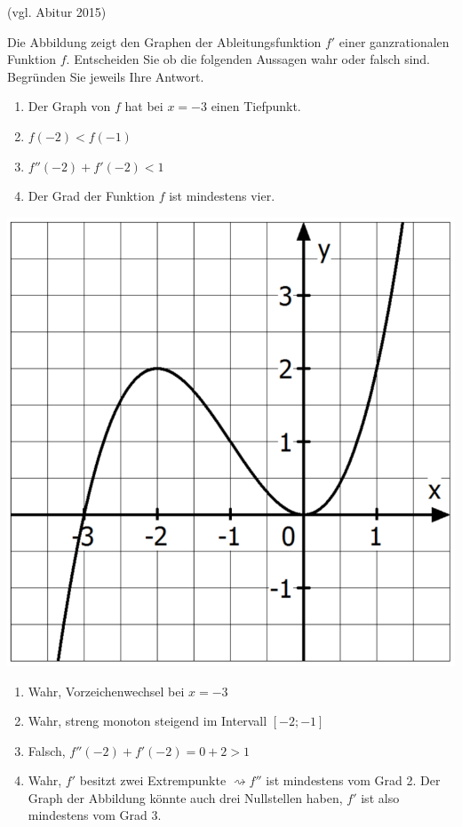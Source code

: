  (vgl. Abitur 2015)
\begin{multicols}{2}
	Die Abbildung zeigt den Graphen der Ableitungsfunktion $f'$ einer ganzrationalen Funktion $f$.
	Entscheiden Sie ob die folgenden Aussagen wahr oder falsch sind. Begründen Sie jeweils Ihre Antwort.
	\begin{enumerate}
		\item Der Graph von $f$ hat bei $x=-3$ einen Tiefpunkt.
		\item $f(-2)<f(-1)$
		\item $f''(-2)+f'(-2)<1$
		\item Der Grad der Funktion $f$ ist mindestens vier.
	\end{enumerate}
	\columnbreak

	\centering
	\includegraphics[width=0.7\linewidth]{Graphanalyse.png}
\end{multicols}

\begin{lsg}{}
	\begin{enumerate}
		\item Wahr, Vorzeichenwechsel bei $x=-3$
		\item Wahr, streng monoton steigend im Intervall $[-2;-1]$
		\item Falsch, $f''(-2)+f'(-2)=0+2>1$
		\item Wahr, $f'$ besitzt zwei Extrempunkte $\rightsquigarrow f''$ ist mindestens vom Grad 2. Der Graph der Abbildung könnte auch drei Nullstellen haben, $f'$ ist also mindestens vom Grad 3.
	\end{enumerate}
\end{lsg}





